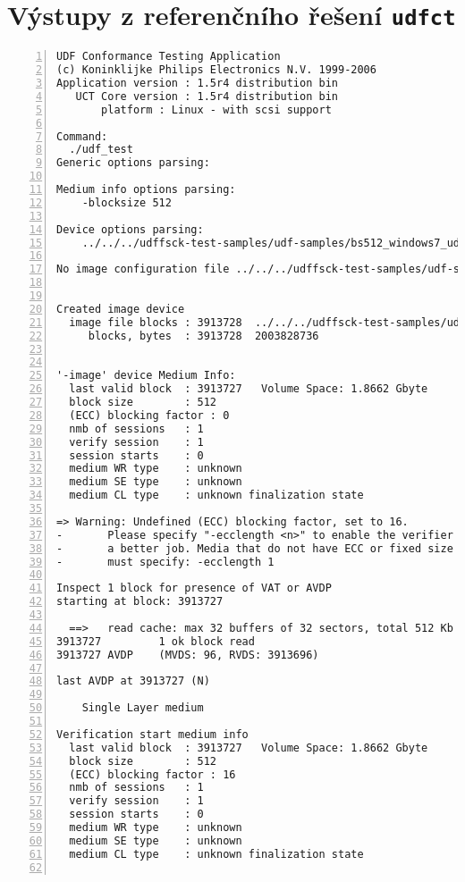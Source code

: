 \chapter{Výstupy z referenčního řešení \texttt{udfct}}
\begin{lstlisting}[frame=single,caption={Výsledek kontroly poškozeného média referenčním programem \texttt{udfct}},label=lst:udfct-broken,basicstyle=\ttfamily\scriptsize, keywordstyle=\color{black}\bfseries\underbar,nolol,numbers=left,texcl=false,escapechar=!]
UDF Conformance Testing Application
(c) Koninklijke Philips Electronics N.V. 1999-2006
Application version : 1.5r4 distribution bin
   UCT Core version : 1.5r4 distribution bin
       platform : Linux - with scsi support

Command:
  ./udf_test
Generic options parsing:

Medium info options parsing:
    -blocksize 512

Device options parsing:
    ../../../udffsck-test-samples/udf-samples/bs512_windows7_udf0201_broken_file_tree.img

No image configuration file ../../../udffsck-test-samples/udf-samples/bs512_windows7_udf0201_broken_file_tree.cfg


Created image device
  image file blocks : 3913728  ../../../udffsck-test-samples/udf-samples/bs512_windows7_udf0201_broken_file_tree.img
     blocks, bytes  : 3913728  2003828736


'-image' device Medium Info:
  last valid block  : 3913727   Volume Space: 1.8662 Gbyte
  block size        : 512
  (ECC) blocking factor : 0
  nmb of sessions   : 1
  verify session    : 1
  session starts    : 0       
  medium WR type    : unknown
  medium SE type    : unknown
  medium CL type    : unknown finalization state

=> Warning: Undefined (ECC) blocking factor, set to 16.
-       Please specify "-ecclength <n>" to enable the verifier to do
-       a better job. Media that do not have ECC or fixed size packets
-       must specify: -ecclength 1

Inspect 1 block for presence of VAT or AVDP
starting at block: 3913727

  ==>   read cache: max 32 buffers of 32 sectors, total 512 Kb
3913727         1 ok block read
3913727 AVDP    (MVDS: 96, RVDS: 3913696)

last AVDP at 3913727 (N)

    Single Layer medium

Verification start medium info
  last valid block  : 3913727   Volume Space: 1.8662 Gbyte
  block size        : 512
  (ECC) blocking factor : 16
  nmb of sessions   : 1
  verify session    : 1
  session starts    : 0       
  medium WR type    : unknown
  medium SE type    : unknown
  medium CL type    : unknown finalization state


\end{lstlisting}
